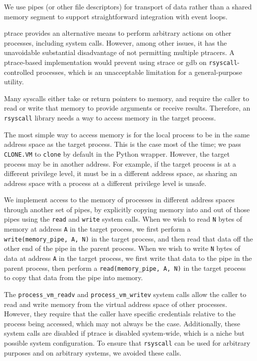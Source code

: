 \documentclass[sigplan]{acmart}
\begin{document}
We use pipes (or other file descriptors) for transport of data rather than a shared memory segment
to support straightforward integration with event loops.

ptrace provides an alternative means to perform arbitrary actions on other processes,
including system calls.
However, among other issues, it has the unavoidable substantial disadvantage of not permitting multiple ptracers.
A ptrace-based implementation would prevent using strace or gdb on \texttt{rsyscall}-controlled processes,
which is an unacceptable limitation for a general-purpose utility.

Many syscalls either take or return pointers to memory,
and require the caller to read or write that memory to provide arguments or receive results.
Therefore, an \texttt{rsyscall} library needs a way to access memory in the target process.

The most simple way to access memory is for the local process to be in the same address space as the target process.
This is the case most of the time; we pass \texttt{CLONE.VM} to \texttt{clone} by default in the Python wrapper.
However, the target process may be in another address.
For example, if the target process is at a different privilege level,
it must be in a different address space,
as sharing an address space with a process at a different privilege level is unsafe.

We implement access to the memory of processes in different address spaces through another set of pipes,
by explicitly copying memory into and out of those pipes using the \texttt{read} and \texttt{write} system calls.
When we wish to read \texttt{N} bytes of memory at address \texttt{A} in the target process,
we first perform a \verb|write(memory_pipe, A, N)| in the target process,
and then read that data off the other end of the pipe in the parent process.
When we wish to write \texttt{N} bytes of data at address \texttt{A} in the target process,
we first write that data to the pipe in the parent process,
then perform a \verb|read(memory_pipe, A, N)| in the target process to copy that data from the pipe into memory.

The \verb|process_vm_readv| and \verb|process_vm_writev| system calls
allow the caller to read and write memory from the virtual address space of other processes.
However, they require that the caller have specific credentials relative to the process being accessed,
which may not always be the case.
Additionally, these system calls are disabled if ptrace is disabled system-wide,
which is a niche but possible system configuration.
To ensure that \texttt{rsyscall} can be used for arbitrary purposes and on arbitrary systems, we avoided these calls.
\end{document}
